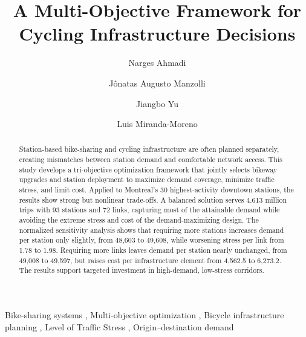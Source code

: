\documentclass[preprint,authoryear,10pt]{elsarticle}
\begin{document}
\begin{frontmatter}

\title{A Multi-Objective Framework for Cycling Infrastructure Decisions}

    
    \author[mcgill]{Narges Ahmadi}
    
    \author[mcgill,inescc]{Jônatas Augusto Manzolli}
    
    \author[mcgill]{Jiangbo Yu}
    
    \author[mcgill]{Luis Miranda-Moreno}
    
    
    \address[mcgill]{Department of Civil Engineering, McGill University, Montreal, QC, Canada}
    \address[inescc]{INESC Coimbra, University of Coimbra, Coimbra, Portugal}

\begin{abstract}

Station-based bike-sharing and cycling infrastructure are often planned separately, creating mismatches between station demand and comfortable network access. This study develops a tri-objective optimization framework that jointly selects bikeway upgrades and station deployment to maximize demand coverage, minimize traffic stress, and limit cost. Applied to Montreal's 30 highest-activity downtown stations, the results show strong but nonlinear trade-offs. A balanced solution serves 4.613 million trips with 93 stations and 72 links, capturing most of the attainable demand while avoiding the extreme stress and cost of the demand-maximizing design. The normalized sensitivity analysis shows that requiring more stations increases demand per station only slightly, from 48,603 to 49,608, while worsening stress per link from 1.78 to 1.98. Requiring more links leaves demand per station nearly unchanged, from 49,008 to 49,597, but raises cost per infrastructure element from 4,562.5 to 6,273.2. The results support targeted investment in high-demand, low-stress corridors.

\end{abstract}

\begin{keyword}
    Bike-sharing systems \sep 
    Multi-objective optimization \sep 
    Bicycle infrastructure planning \sep 
    Level of Traffic Stress \sep 
    Origin–destination demand
\end{keyword}

\end{frontmatter}
\end{document}
